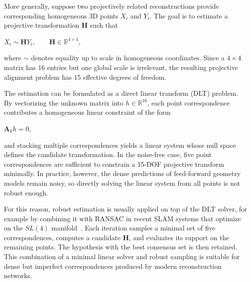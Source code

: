 More generally, suppose two projectively related reconstructions provide corresponding homogeneous 3D points $X_i$ and $Y_i$. The goal is to estimate a projective transformation $\mathbf{H}$ such that
\begin{center}
    $\displaystyle X_i \sim \mathbf{H} Y_i, \qquad \mathbf{H} \in \mathbb{R}^{4\times 4},$
\end{center}
where $\sim$ denotes equality up to scale in homogeneous coordinates. Since a $4\times 4$ matrix has 16 entries but one global scale is irrelevant, the resulting projective alignment problem has 15 effective degrees of freedom.

The estimation can be formulated as a direct linear transform (DLT) problem. By vectorizing the unknown matrix into $h\in\mathbb{R}^{16}$, each point correspondence contributes a homogeneous linear constraint of the form
\begin{center}
    $\displaystyle \mathbf{A}_k h = 0,$
\end{center}
and stacking multiple correspondences yields a linear system whose null space defines the candidate transformation. In the noise-free case, five point correspondences are sufficient to constrain a 15-DOF projective transform minimally. In practice, however, the dense predictions of feed-forward geometry models remain noisy, so directly solving the linear system from all points is not robust enough.

For this reason, robust estimation is usually applied on top of the DLT solver, for example by combining it with RANSAC in recent SLAM systems that optimize on the $SL(4)$ manifold~\cite{maggio2025vggtslam}. Each iteration samples a minimal set of five correspondences, computes a candidate $\mathbf{H}$, and evaluates its support on the remaining points. The hypothesis with the best consensus set is then retained. This combination of a minimal linear solver and robust sampling is suitable for dense but imperfect correspondences produced by modern reconstruction networks.

